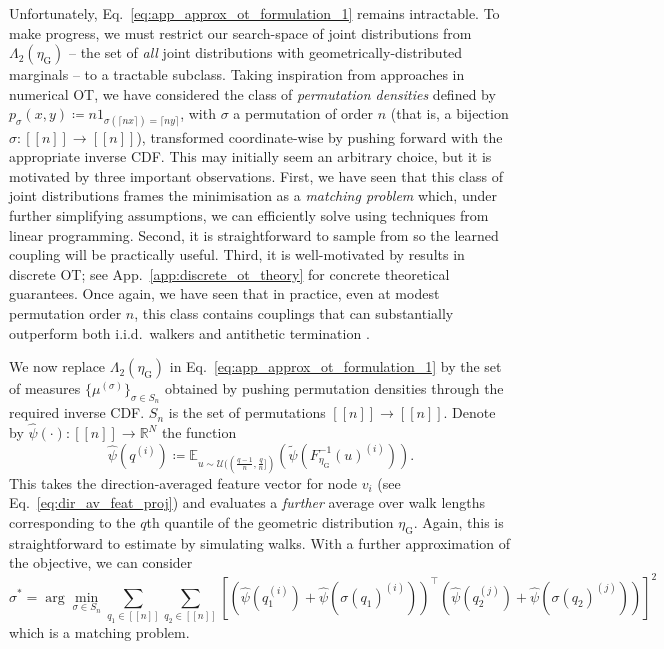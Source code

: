Unfortunately, Eq.~\ref{eq:app_approx_ot_formulation_1} remains intractable. 
To make progress, we must restrict our search-space of joint distributions from $\Lambda_2(\eta_\textrm{G})$ -- the set of \emph{all} joint distributions with geometrically-distributed marginals -- to a tractable subclass. 
Taking inspiration from approaches in numerical OT, we have considered the class of \emph{permutation densities} defined by $p_\sigma(x,y) \coloneqq n 1_{\sigma(\lceil nx \rceil) = \lceil ny \rceil}$,
 with $\sigma$ a permutation of order $n$ (that is, a bijection $\sigma: [\![n]\!] \to [\![n]\!]$), transformed coordinate-wise by pushing forward with the appropriate inverse CDF. 
This may initially seem an arbitrary choice, but it is motivated by three important observations. 
First, we have seen that this class of joint distributions frames the minimisation as a \emph{matching problem} which, under further simplifying assumptions, we can efficiently solve using techniques from linear programming.
Second, it is straightforward to sample from so the learned coupling will be practically useful. 
Third, it is well-motivated by results in discrete OT; see App.~\ref{app:discrete_ot_theory} for concrete theoretical guarantees. 
Once again, we have seen that in practice, even at modest permutation order $n$, this class contains couplings that can substantially outperform both i.i.d.~walkers and antithetic termination \citep{reid2023quasi}.

We now replace $\Lambda_2(\eta_\textrm{G})$ in Eq.~\ref{eq:app_approx_ot_formulation_1} by the set of measures $\{\mu^{(\sigma)} \}_{\sigma  \in S_n}$ obtained by pushing permutation densities through the required inverse CDF.
 $S_n$ is the set of permutations $[\![n]\!] \to [\![n]\!]$.
Denote by $\widehat{\psi}(\cdot) :[\![n]\!] \to \mathbb{R}^N$ the function
\begin{equation}
   \widehat{\psi}(q^{(i)}) \coloneqq \mathbb{E}_{u \sim \mathcal{U}((\frac{q-1}{n}, \frac{q}{n}])} \left( \widetilde{\psi}( F^{-1}_{\eta_\textrm{G}} (u)^{(i)})\right). 
\end{equation}
This takes the direction-averaged feature vector for node $v_i$ (see Eq.~\ref{eq:dir_av_feat_proj}) and evaluates a \emph{further} average over walk lengths corresponding to the $q$th quantile of the geometric distribution $\eta_\textrm{G}$.
Again, this is straightforward to estimate by simulating walks.
With a further approximation of the objective, we can consider 
\small
\begin{equation} \label{eq:approx_ot_formulation_matching}
    \sigma^* = \arg \min_{\sigma \in S_n}  \sum_{q_1 \in [\![n]\!]} \sum_{q_2 \in [\![n]\!]} \left [ \left( \widehat{\psi}( q_{1}^{(i)}) + \widehat{\psi}( \sigma(q_1)^{(i)}) \right)^\top \left( \widehat{\psi}( q_{2}^{(j)}) + \widehat{\psi}( \sigma(q_2)^{(j)}) \right) \right]^2 
\end{equation}
\normalsize
which is a matching problem.

